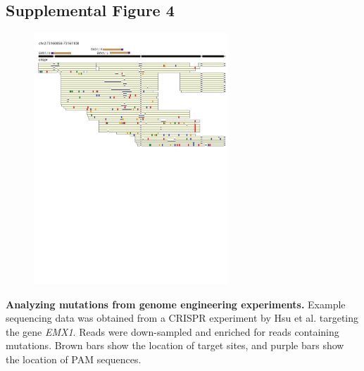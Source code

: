 \subsection{Supplemental Figure 4}
\begin{figure}[h!]
\centering
\label{fig:pbvsup4}
\includegraphics[width=0.65\textwidth]{Figures/App2/SuppFig4.pdf}
\end{figure}
\textbf{Analyzing mutations from genome engineering experiments.} Example sequencing data was obtained from a CRISPR experiment by Hsu et al. \cite{HsuScottWeinsteinEtAl2013} targeting the gene \emph{EMX1}. Reads were down-sampled and enriched for reads containing mutations. Brown bars show the location of target sites, and purple bars show the location of PAM sequences. 

\pagebreak
